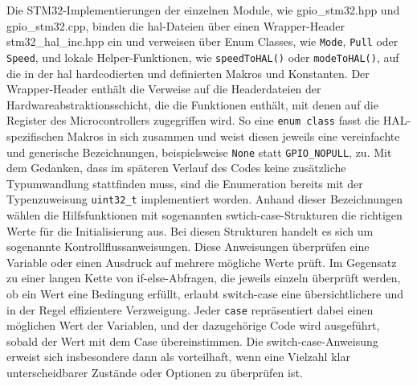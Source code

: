 Die STM32-Implementierungen der einzelnen Module, wie gpio\_stm32.hpp und gpio\_stm32.cpp, binden die \gls{hal}-Dateien über einen Wrapper-Header stm32\_hal\_inc.hpp ein und verweisen über Enum Classes, wie \texttt{Mode}, \texttt{Pull} oder \texttt{Speed}, und lokale Helper-Funktionen, wie \texttt{speedToHAL()} oder \texttt{modeToHAL()}, auf die in der \gls{hal} hardcodierten und definierten Makros und Konstanten.
Der Wrapper-Header enthält die Verweise auf die Headerdateien der Hardwareabstraktionsschicht, die die Funktionen enthält, mit denen auf die Register des Microcontrollers zugegriffen wird.
So eine \texttt{enum class} fasst die HAL-spezifischen Makros in sich zusammen und weist diesen jeweils eine vereinfachte und generische Bezeichnungen, beispielsweise \texttt{None} statt \texttt{GPIO\_NOPULL}, zu.
Mit dem Gedanken, dass im späteren Verlauf des Codes keine zusätzliche Typumwandlung stattfinden muss, sind die Enumeration bereits mit der Typenzuweisung \texttt{uint32\_t} implementiert worden.
Anhand dieser Bezeichnungen wählen die Hilfsfunktionen mit sogenannten swtich-case-Strukturen die richtigen Werte für die Initialisierung aus.
Bei diesen Strukturen handelt es sich um sogenannte Kontrollflussanweisungen.
Diese Anweisungen überprüfen eine Variable oder einen Ausdruck auf mehrere mögliche Werte prüft.
Im Gegensatz zu einer langen Kette von if-else-Abfragen, die jeweils einzeln überprüft werden, ob ein Wert eine Bedingung erfüllt, erlaubt switch-case eine übersichtlichere und in der Regel effizientere Verzweigung.
Jeder \texttt{case} repräsentiert dabei einen möglichen Wert der Variablen, und der dazugehörige Code wird ausgeführt, sobald der Wert mit dem Case übereinstimmen.
Die switch-case-Anweisung erweist sich insbesondere dann als vorteilhaft, wenn eine Vielzahl klar unterscheidbarer Zustände oder Optionen zu überprüfen ist. 

